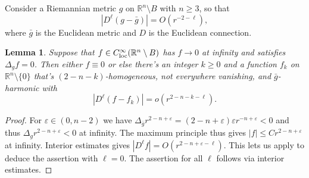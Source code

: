 \documentclass[11pt]{amsart}
\numberwithin{equation}{section}
\theoremstyle{plain}
\newtheorem{lemma}[lemma]{Lemma}
\theoremstyle{definition}
\theoremstyle{remark}
\newcommand{\R}{\mathbb{R}}
\newcommand{\eps}{\varepsilon}
\begin{document}
Consider a Riemannian metric $g$ on $\R^n \setminus B$ with $n\geq 3$, so that 
\begin{equation}\label{eq:g-AF-def}
| D^\ell(g-\bar g)| = O(r^{-2 - \ell}),
\end{equation}
where $\bar g$ is the Euclidean metric and $ D$ is the Euclidean connection. 

\begin{lemma}\label{lemm:harmonic-expansion}
Suppose that $f \in C^\infty_\textnormal{loc}(\R^n\setminus B)$ has $f\to 0$ at infinity and satisfies $\Delta_g f = 0$. Then either $f\equiv 0$ or else there's an integer $k \geq 0$ and a function $f_k$ on $\R^n\setminus\{0\}$ that's $(2-n-k)$-homogeneous, not everywhere vanishing, and $\bar g$-harmonic with
\[
|D^\ell(f-f_k)| = o(r^{2-n-k-\ell}). 
\] 
\end{lemma}
\begin{proof}
For $\eps \in (0,n-2)$ we have $\Delta_{\bar g} r^{2-n+\eps} = (2-n+\eps)\eps r^{-n+\eps} < 0$ and thus $\Delta_g  r^{2-n+\eps}  < 0$ at infinity. The maximum principle thus gives $|f| \leq Cr^{2-n+\eps}$ at infinity. Interior estimates gives $|D^\ell f| = O(r^{2-n+\eps-\ell})$. This lets us apply \cite[Theorem 1.17]{Bartnik} to deduce the assertion with $\ell=0$. The assertion for all $\ell$ follows via interior estimates. 
\end{proof}





\end{document}
